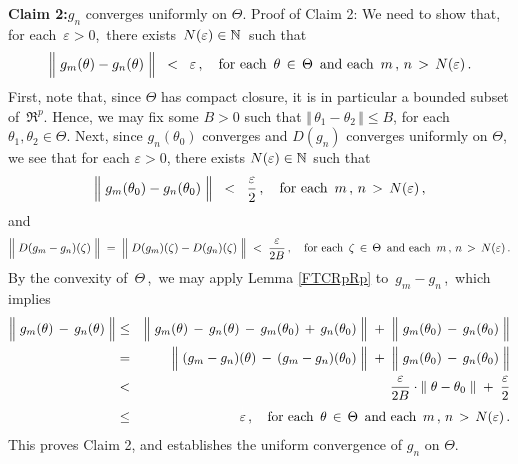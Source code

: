 \vskip 0.5cm
\noindent
\textbf{Claim 2:}\quad $g_{n}$ converges uniformly on $\Theta$.
\vskip 0.1cm
\noindent
Proof of Claim 2:\quad
We need to show that, for each \,$\varepsilon > 0$,\, there exists \,$N(\varepsilon) \in \mathbb{N}$\, such that
\begin{equation*}
\left\Vert\;g_{m}(\theta) \overset{{\color{white}.}}{-} g_{n}(\theta)\;\right\Vert \;\; < \;\; \varepsilon\,,
\quad
\textnormal{for each \,$\theta \,\in\, \Theta$\, and each \,$m\,,\,n \,>\, N(\varepsilon)$}\,.
\end{equation*}
First, note that, since $\Theta$ has compact closure, it is in particular a bounded subset of \,$\Re^{p}$.
Hence, we may fix some $B > 0$ such that
$\Vert\,\theta_{1} - \theta_{2}\,\Vert \leq B$, for each $\theta_{1}, \theta_{2}\in\Theta$.
Next, since $g_{n}(\theta_{0})$ converges and $D(g_{n})$ converges uniformly on $\Theta$,
we see that for each $\varepsilon > 0$, there exists $N(\varepsilon) \in \mathbb{N}$ such that
\begin{equation*}
\left\Vert\;g_{m}(\theta_{0}) \overset{{\color{white}.}}{-} g_{n}(\theta_{0})\;\right\Vert \;\; < \;\; \dfrac{\varepsilon}{2}\,,
\quad
\textnormal{for each \,$m\,,\,n \,>\, N(\varepsilon)$}\,,
\end{equation*}
and
\begin{equation*}
\left\Vert\; D(g_{m} \overset{{\color{white}.}}{-} g_{n})(\zeta) \;\right\Vert
\; = \;
	\left\Vert\;D(g_{m})(\zeta) \overset{{\color{white}.}}{-} D(g_{n})(\zeta)\;\right\Vert
\; < \;
	\dfrac{\varepsilon}{2 B}\,,
\quad
\textnormal{for each \,$\zeta \,\in\, \Theta$\, and each \,$m\,,\,n \,>\, N(\varepsilon)$}\,.
\end{equation*}
By the convexity of \,$\Theta$\,,\, we may apply Lemma \ref{FTCRpRp} to \,$g_{m} - g_{n}$\,,\,
which implies
\begin{eqnarray*}
\left\Vert\; g_{m}(\theta) \,\overset{{\color{white}.}}{-}\, g_{n}(\theta) \;\right\Vert
& \leq &
	\left\Vert\; g_{m}(\theta) \,\overset{{\color{white}.}}{-}\, g_{n}(\theta) \, - \, g_{m}(\theta_{0}) \,+\, g_{n}(\theta_{0}) \;\right\Vert
	\; + \;
	\left\Vert\; g_{m}(\theta_{0}) \,\overset{{\color{white}.}}{-}\, g_{n}(\theta_{0}) \;\right\Vert
\\
& = &
	\left\Vert\; (g_{m} - g_{n})(\theta) \,\overset{{\color{white}.}}{-}\, (g_{m} - g_{n})(\theta_{0}) \;\right\Vert
	\; + \;
	\left\Vert\; g_{m}(\theta_{0}) \,\overset{{\color{white}.}}{-}\, g_{n}(\theta_{0}) \;\right\Vert
\\
& < &
	\dfrac{\varepsilon}{2 B} \cdot \left\Vert\; \theta - \theta_{0} \;\right\Vert
	\; + \;
	\dfrac{\varepsilon}{2}
\\
& \leq &
	\overset{{\color{white}1}}{\varepsilon}\,,
	\quad
	\textnormal{for each \,$\theta \,\in\, \Theta$\, and each \,$m\,,\,n \,>\, N(\varepsilon)$}\,.
\end{eqnarray*}
This proves Claim 2, and establishes the uniform convergence of $g_{n}$ on $\Theta$.

